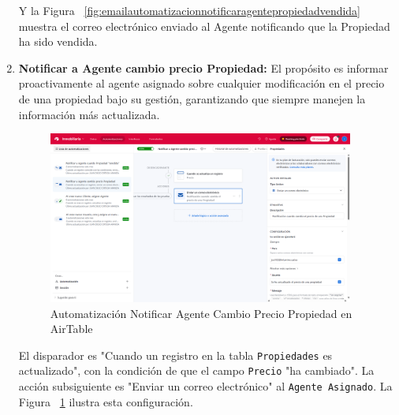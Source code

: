 \begin{enumerate}
    Y la Figura ~\ref{fig:emailautomatizacionnotificaragentepropiedadvendida} muestra el correo electrónico enviado al Agente notificando que la Propiedad ha sido vendida.
    
    \item \textbf{Notificar a Agente cambio precio Propiedad:} El propósito es informar proactivamente al agente asignado sobre cualquier modificación en el precio de una propiedad bajo su gestión, garantizando que siempre manejen la información más actualizada.

    \begin{figure}[H]
        \begin{center}
            \includegraphics[width = 0.95\textwidth]{Figuras/automatizacionnotificaragentecambiopreciopropiedad.png}
        \end{center}
        \caption{\label{fig:automatizacionnotificaragentecambiopreciopropiedad} Automatización Notificar Agente Cambio Precio Propiedad en AirTable}
    \end{figure}

    El disparador es "Cuando un registro en la tabla \texttt{Propiedades} es actualizado", con la condición de que el campo \texttt{Precio} "ha cambiado". La acción subsiguiente es "Enviar un correo electrónico" al \texttt{Agente Asignado}. La Figura ~\ref{fig:automatizacionnotificaragentecambiopreciopropiedad} ilustra esta configuración.


\end{enumerate}
